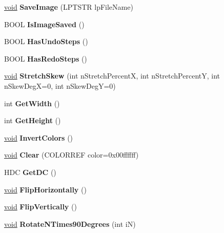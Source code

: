 \begin{DoxyCompactItemize}
\hyperlink{interfacevoid}{void} {\bfseries Save\+Image} (L\+P\+T\+S\+TR lp\+File\+Name)
\item 
\mbox{\label{class_image_model_a89aafa3983c2742e3f3322e974a3f3e6}} 
B\+O\+OL {\bfseries Is\+Image\+Saved} ()
\item 
\mbox{\label{class_image_model_a23b0ace9e34a7c156b094193dca13380}} 
B\+O\+OL {\bfseries Has\+Undo\+Steps} ()
\item 
\mbox{\label{class_image_model_ad85144715259a9af08c1f897b5378a28}} 
B\+O\+OL {\bfseries Has\+Redo\+Steps} ()
\item 
\mbox{\label{class_image_model_ae659917de3e73aa212c5c041d4af8020}} 
\hyperlink{interfacevoid}{void} {\bfseries Stretch\+Skew} (int n\+Stretch\+PercentX, int n\+Stretch\+PercentY, int n\+Skew\+DegX=0, int n\+Skew\+DegY=0)
\item 
\mbox{\label{class_image_model_aa99b8e59c2f4f4fd9c586998943bd2c8}} 
int {\bfseries Get\+Width} ()
\item 
\mbox{\label{class_image_model_a742b56c711cc67688f5d57a2a22c4b66}} 
int {\bfseries Get\+Height} ()
\item 
\mbox{\label{class_image_model_a668ec0a4bda8e685f77f2f986f581682}} 
\hyperlink{interfacevoid}{void} {\bfseries Invert\+Colors} ()
\item 
\mbox{\label{class_image_model_ae78d9296e62acf5ab89ea5405d9a7c70}} 
\hyperlink{interfacevoid}{void} {\bfseries Clear} (C\+O\+L\+O\+R\+R\+EF color=0x00ffffff)
\item 
\mbox{\label{class_image_model_abc0a42a01afb699074d5e1ec523e499d}} 
H\+DC {\bfseries Get\+DC} ()
\item 
\mbox{\label{class_image_model_a3d6443fcee74da77d95d139428f378c2}} 
\hyperlink{interfacevoid}{void} {\bfseries Flip\+Horizontally} ()
\item 
\mbox{\label{class_image_model_a3adc5112303798d47eec45a3f7239f3b}} 
\hyperlink{interfacevoid}{void} {\bfseries Flip\+Vertically} ()
\item 
\mbox{\label{class_image_model_aa0975516775ae399584981f9c309af7c}} 
\hyperlink{interfacevoid}{void} {\bfseries Rotate\+N\+Times90\+Degrees} (int iN)
\end{DoxyCompactItemize}
